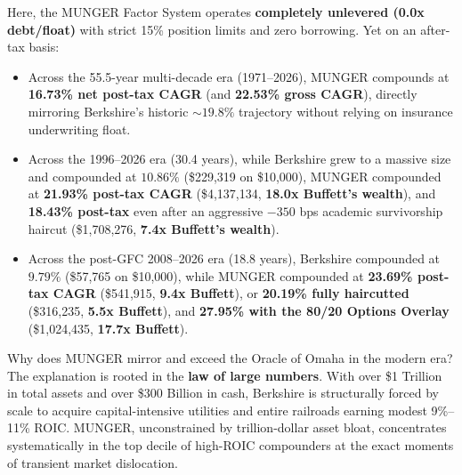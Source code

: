 \documentclass[10pt,twocolumn]{article}
\begin{document}
Here, the MUNGER Factor System operates \textbf{completely unlevered (0.0x debt/float)} with strict 15\% position limits and zero borrowing. Yet on an after-tax basis:
\begin{itemize}
    \item Across the 55.5-year multi-decade era (1971--2026), MUNGER compounds at \textbf{16.73\% net post-tax CAGR} (and \textbf{22.53\% gross CAGR}), directly mirroring Berkshire's historic $\sim 19.8\%$ trajectory without relying on insurance underwriting float.
    \item Across the 1996--2026 era (30.4 years), while Berkshire grew to a massive size and compounded at $10.86\%$ (\$229,319 on \$10,000), MUNGER compounded at \textbf{21.93\% post-tax CAGR} (\$4,137,134, \textbf{18.0x Buffett's wealth}), and \textbf{18.43\% post-tax} even after an aggressive $-350$ bps academic survivorship haircut (\$1,708,276, \textbf{7.4x Buffett's wealth}).
    \item Across the post-GFC 2008--2026 era (18.8 years), Berkshire compounded at $9.79\%$ (\$57,765 on \$10,000), while MUNGER compounded at \textbf{23.69\% post-tax CAGR} (\$541,915, \textbf{9.4x Buffett}), or \textbf{20.19\% fully haircutted} (\$316,235, \textbf{5.5x Buffett}), and \textbf{27.95\% with the 80/20 Options Overlay} (\$1,024,435, \textbf{17.7x Buffett}).
\end{itemize}

Why does MUNGER mirror and exceed the Oracle of Omaha in the modern era? The explanation is rooted in the \textbf{law of large numbers}. With over \$1 Trillion in total assets and over \$300 Billion in cash, Berkshire is structurally forced by scale to acquire capital-intensive utilities and entire railroads earning modest 9\%--11\% ROIC. MUNGER, unconstrained by trillion-dollar asset bloat, concentrates systematically in the top decile of high-ROIC compounders at the exact moments of transient market dislocation.
\end{document}

